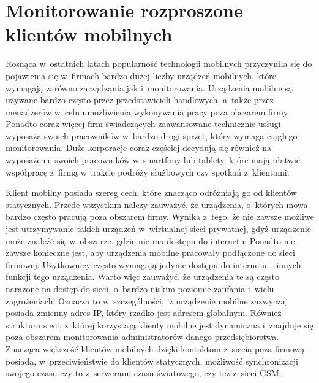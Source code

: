 \section[Monitorowanie rozproszone][Monitorowanie rozproszone klientów
mobilnych]{Monitorowanie rozproszone klientów mobilnych}

Rosnąca w~ostatnich latach popularność technologii mobilnych
przyczyniła się do pojawienia się w~firmach bardzo dużej liczby
urządzeń mobilnych, które wymagają zarówno zarządzania jak
i~monitorowania. Urządzenia mobilne są używane bardzo często przez
przedstawicieli handlowych, a~także przez menadżerów w~celu
umożliwienia wykonywania pracy poza obszarem firmy. Ponadto coraz
więcej firm świadczących zaawansowane technicznie usługi wyposaża
swoich pracowników w~bardzo drogi sprzęt, który wymaga ciągłego
monitorowania. Duże korporacje coraz częściej decydują się również na
wyposażenie swoich pracowników w~smartfony lub tablety, które mają
ułatwić współpracę z~firmą w trakcie podróży służbowych czy spotkań
z~klientami.

Klient mobilny posiada szereg cech, które znacząco odróżniają go od
klientów statycznych. Przede wszystkim należy zauważyć, że urządzenia,
o~których mowa bardzo często pracują poza obszarem firmy. Wynika
z~tego, że nie zawsze możliwe jest utrzymywanie takich urządzeń
w~wirtualnej sieci prywatnej, gdyż urządzenie może znaleźć się
w~obszarze, gdzie nie ma dostępu do internetu. Ponadto nie zawsze
konieczne jest, aby urządzenia mobilne pracowały podłączone do sieci
firmowej. Użytkownicy często wymagają jedynie dostępu do internetu
i~innych funkcji tego urządzenia. Warto więc zauważyć, że urządzenia
te są często narażone na dostęp do sieci, o~bardzo niskim poziomie
zaufania i~wielu zagrożeniach. Oznacza to w~szczególności, iż
urządzenie mobilne zazwyczaj posiada zmienny adres IP, który rzadko
jest adresem globalnym. Również struktura sieci, z~której korzystają
klienty mobilne jest dynamiczna i~znajduje się poza obszarem
monitorowania administratorów danego przedsiębiorstwa. Znacząca
większość klientów mobilnych dzięki kontaktom z~siecią poza firmową
posiada, w~przeciwieństwie do klientów statycznych, możliwość
synchronizacji swojego czasu czy to z~serwerami czasu światowego, czy
też z~sieci GSM.

